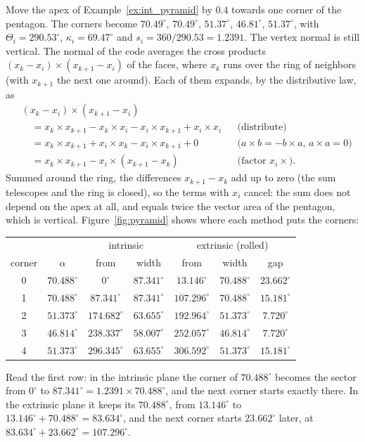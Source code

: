 \begin{example}
\label{ex:int_leaning}
Move the apex of Example~\ref{ex:int_pyramid} by $0.4$ towards one corner of the pentagon. The corners become $70.49^\circ$, $70.49^\circ$, $51.37^\circ$, $46.81^\circ$, $51.37^\circ$, with $\Theta_i = 290.53^\circ$, $\kappa_i = 69.47^\circ$ and $s_i = 360/290.53 = 1.2391$. The vertex normal is still vertical. The normal of the code averages the cross products $(x_k - x_i) \times (x_{k+1} - x_i)$ of the faces, where $x_k$ runs over the ring of neighbors (with $x_{k+1}$ the next one around). Each of them expands, by the distributive law, as
\begin{align*}
&(x_k - x_i) \times (x_{k+1} - x_i) \\
&\quad= x_k \times x_{k+1} - x_k \times x_i - x_i \times x_{k+1} + x_i \times x_i && \text{(distribute)} \\
&\quad= x_k \times x_{k+1} + x_i \times x_k - x_i \times x_{k+1} + 0 && \text{($a\times b = -b\times a$, $a \times a = 0$)} \\
&\quad= x_k \times x_{k+1} - x_i \times (x_{k+1} - x_k) && \text{(factor $x_i \times$).}
\end{align*}
Summed around the ring, the differences $x_{k+1} - x_k$ add up to zero (the sum telescopes and the ring is closed), so the terms with $x_i$ cancel: the sum does not depend on the apex at all, and equals twice the vector area of the pentagon, which is vertical. Figure~\ref{fig:pyramid} shows where each method puts the corners:
\begin{center}
\footnotesize
\begin{tabular}{c c | c c | c c c}
\toprule
& & \multicolumn{2}{c|}{intrinsic} & \multicolumn{3}{c}{extrinsic (rolled)} \\
corner & $\alpha$ & from & width & from & width & gap \\
\midrule
0 & $70.488^\circ$ & $0^\circ$ & $87.341^\circ$ & $13.146^\circ$ & $70.488^\circ$ & $23.662^\circ$ \\
1 & $70.488^\circ$ & $87.341^\circ$ & $87.341^\circ$ & $107.296^\circ$ & $70.488^\circ$ & $15.181^\circ$ \\
2 & $51.373^\circ$ & $174.682^\circ$ & $63.655^\circ$ & $192.964^\circ$ & $51.373^\circ$ & $7.720^\circ$ \\
3 & $46.814^\circ$ & $238.337^\circ$ & $58.007^\circ$ & $252.057^\circ$ & $46.814^\circ$ & $7.720^\circ$ \\
4 & $51.373^\circ$ & $296.345^\circ$ & $63.655^\circ$ & $306.592^\circ$ & $51.373^\circ$ & $15.181^\circ$ \\
\bottomrule
\end{tabular}
\end{center}
Read the first row: in the intrinsic plane the corner of $70.488^\circ$ becomes the sector from $0^\circ$ to $87.341^\circ = 1.2391 \times 70.488^\circ$, and the next corner starts exactly there. In the extrinsic plane it keeps its $70.488^\circ$, from $13.146^\circ$ to $13.146^\circ + 70.488^\circ = 83.634^\circ$, and the next corner starts $23.662^\circ$ later, at $83.634^\circ + 23.662^\circ = 107.296^\circ$.


\end{example}
